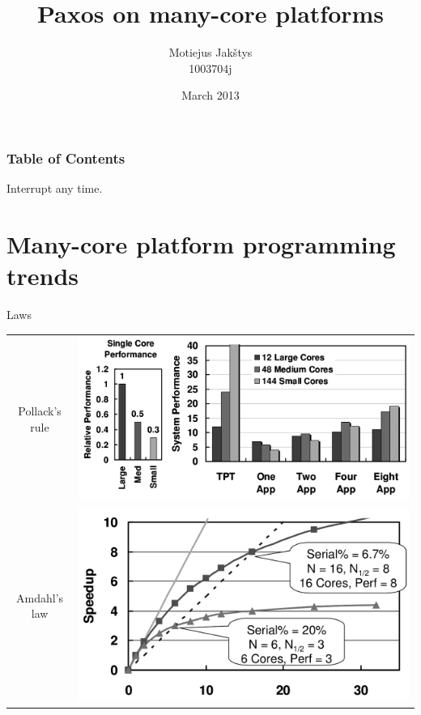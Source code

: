 \documentclass[14pt]{beamer}
\title{Paxos on many-core platforms}
\author{Motiejus Jak\v{s}tys \\
1003704j}
\date{March 2013}
\begin{document}
\begin{frame}[plain]
    \titlepage
\end{frame}

\begin{frame}
    \frametitle{Table of Contents}
    \tableofcontents
    \hfill
    Interrupt any time.
\end{frame}

\section{Many-core platform programming trends}

\begin{frame}{Laws}
    \pause
    \begin{tabular}{cm{0cm}}
            Pollack's rule &
            \pause
            \includegraphics[height=0.4\textheight]{images/pollack.png}
            \\
            Amdahl's law &
            \pause
            \includegraphics[height=0.4\textheight]{images/amdahl.png} \\
    \end{tabular}
\end{frame}
\end{document}
